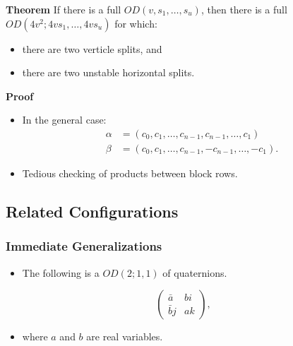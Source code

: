 \documentclass{beamer}
\begin{document}
\begin{frame}

  \begin{block}{{\bf Theorem} \cite[][]{split-od}}
    If there is a full $OD(v,s_1,\dots,s_u)$, then there is a full $OD(4v^2; 4vs_1, \dots, 4vs_u)$ for which:
    \begin{itemize}
    \item there are two verticle splits, and
    \item there are two unstable horizontal splits.
    \end{itemize}
  \end{block}

  \begin{block}{{\bf Proof}}
    \begin{itemize}
    \item In the general case:
      \begin{align*}
        \alpha &= (c_0, c_1, \dots, c_{n-1},c_{n-1},\dots,c_1) \\
        \beta &= (c_0, c_1, \dots, c_{n-1},-c_{n-1},\dots,-c_1).
      \end{align*}
    \item Tedious checking of products between block rows.
    \end{itemize}
  \end{block}
  
\end{frame}


\subsection{Related Configurations}


\subsubsection{Immediate Generalizations}

\begin{frame}

  \begin{itemize}
  \item The following is a $OD(2;1,1)$ of quaternions.
  \end{itemize}

  \[
    \begin{pmatrix}
      \bar{a} & bi \\
      \bar{b}j & ak
    \end{pmatrix},
  \]

  \begin{itemize}
  \item where $a$ and $b$ are real variables.
  \end{itemize}
  
\end{frame}
\end{document}
